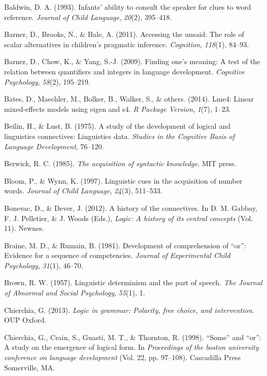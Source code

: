 \documentclass[oneside]{report}
\theoremstyle{definition}
\theoremstyle{definition}
\theoremstyle{definition}
\theoremstyle{remark}
\begin{document}
\hypertarget{ref-baldwin1993infants}{}
Baldwin, D. A. (1993). Infants' ability to consult the speaker for clues
to word reference. \emph{Journal of Child Language}, \emph{20}(2),
395--418.

\hypertarget{ref-barner2011accessing}{}
Barner, D., Brooks, N., \& Bale, A. (2011). Accessing the unsaid: The
role of scalar alternatives in children's pragmatic inference.
\emph{Cognition}, \emph{118}(1), 84--93.

\hypertarget{ref-barner2009finding}{}
Barner, D., Chow, K., \& Yang, S.-J. (2009). Finding one's meaning: A
test of the relation between quantifiers and integers in language
development. \emph{Cognitive Psychology}, \emph{58}(2), 195--219.

\hypertarget{ref-bates2014lme4}{}
Bates, D., Maechler, M., Bolker, B., Walker, S., \& others. (2014).
Lme4: Linear mixed-effects models using eigen and s4. \emph{R Package
Version}, \emph{1}(7), 1--23.

\hypertarget{ref-beilin1975study}{}
Beilin, H., \& Lust, B. (1975). A study of the development of logical
and linguistics connectives: Linguistics data. \emph{Studies in the
Cognitive Basis of Language Development}, 76--120.

\hypertarget{ref-berwick1985acquisition}{}
Berwick, R. C. (1985). \emph{The acquisition of syntactic knowledge}.
MIT press.

\hypertarget{ref-bloom1997linguistic}{}
Bloom, P., \& Wynn, K. (1997). Linguistic cues in the acquisition of
number words. \emph{Journal of Child Language}, \emph{24}(3), 511--533.

\hypertarget{ref-gabbay2012logic}{}
Bonevac, D., \& Dever, J. (2012). A history of the connectives. In D. M.
Gabbay, F. J. Pelletier, \& J. Woods (Eds.), \emph{Logic: A history of
its central concepts} (Vol. 11). Newnes.

\hypertarget{ref-braine1981development}{}
Braine, M. D., \& Rumain, B. (1981). Development of comprehension of
``or'': Evidence for a sequence of competencies. \emph{Journal of
Experimental Child Psychology}, \emph{31}(1), 46--70.

\hypertarget{ref-brown1957linguistic}{}
Brown, R. W. (1957). Linguistic determinism and the part of speech.
\emph{The Journal of Abnormal and Social Psychology}, \emph{55}(1), 1.

\hypertarget{ref-chierchia2013logic}{}
Chierchia, G. (2013). \emph{Logic in grammar: Polarity, free choice, and
intervention}. OUP Oxford.

\hypertarget{ref-chierchia1998some}{}
Chierchia, G., Crain, S., Guasti, M. T., \& Thornton, R. (1998).
``Some'' and ``or'': A study on the emergence of logical form. In
\emph{Proceedings of the boston university conference on language
development} (Vol. 22, pp. 97--108). Cascadilla Press Somerville, MA.
\end{document}
